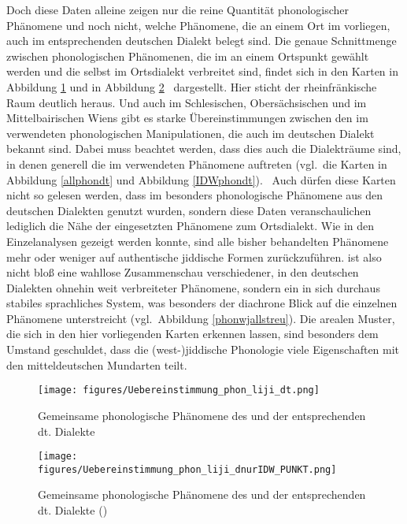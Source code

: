 {Doch diese Daten alleine zeigen nur die reine Quantität phonologischer Phänomene und noch nicht, welche Phänomene, die an einem Ort im  vorliegen, auch im entsprechenden deutschen Dialekt belegt sind. Die genaue Schnittmenge zwischen phonologischen Phänomenen, die im  an einem Ortspunkt gewählt werden und die selbst im Ortsdialekt verbreitet sind, findet sich in den Karten in Abbildung \ref{allphondtliji} und in Abbildung \ref{IDWallphondtliji} \,%
    dargestellt. Hier sticht der rheinfränkische Raum deutlich heraus. Und auch im Schlesischen, Obersächsischen und im Mittelbairischen Wiens gibt es starke Übereinstimmungen zwischen den im  verwendeten phonologischen Manipulationen, die auch im deutschen Dialekt bekannt sind. Dabei muss beachtet werden, dass dies auch die Dialekträume sind, in denen generell die im  verwendeten Phänomene auftreten (vgl.\, die Karten in Abbildung \ref{allphondt} und Abbildung \ref{IDWphondt}). \,%
    Auch dürfen diese Karten nicht so gelesen werden, dass im  besonders phonologische Phänomene aus den deutschen Dialekten genutzt wurden, sondern diese Daten veranschaulichen lediglich die Nähe der eingesetzten Phänomene zum Ortsdialekt. Wie in den Einzelanalysen gezeigt werden konnte, sind alle bisher behandelten Phänomene mehr oder weniger auf authentische jiddische Formen zurückzuführen. \hai{{\LiJieins}} ist also nicht bloß eine wahllose Zusammenschau verschiedener, in den deutschen Dialekten ohnehin weit verbreiteter Phänomene, sondern ein in sich durchaus stabiles  sprachliches System, was besonders der diachrone Blick auf die einzelnen Phänomene unterstreicht (vgl.\, Abbildung \ref{phonwjallstreu}). Die arealen Muster, die sich in den hier vorliegenden Karten erkennen lassen, sind besonders dem Umstand geschuldet, dass die (west-)jiddische Phonologie viele Eigenschaften mit den mitteldeutschen Mundarten teilt.


 \begin{figure}

		\centering
\texttt{[image: figures/Uebereinstimmung\_phon\_liji\_dt.png]}
		\caption{\label{allphondtliji}Gemeinsame phonologische Phänomene des  und der entsprechenden dt. Dialekte}
		\end{figure}
 
 
 
 \begin{figure}
  \farbgrafik
		\centering
\texttt{[image: figures/Uebereinstimmung\_phon\_liji\_dnurIDW\_PUNKT.png]}
		\caption{\label{IDWallphondtliji} Gemeinsame phonologische Phänomene des  und der entsprechenden dt. Dialekte ()}
		\end{figure}

}
